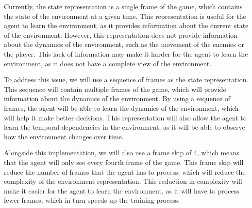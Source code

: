 Currently, the state representation is a single frame of the game, which
contains the state of the environment at a given time. This representation is
useful for the agent to learn the environment, as it provides information about
the current state of the environment. However, this representation does not
provide information about the dynamics of the environment, such as the movement
of the enemies or the player. This lack of information may make it harder for
the agent to learn the environment, as it does not have a complete view of the
environment.

To address this issue, we will use a sequence of frames as the state
representation. This sequence will contain multiple frames of the game, which
will provide information about the dynamics of the environment. By using a
sequence of frames, the agent will be able to learn the dynamics of the
environment, which will help it make better decisions. This representation will
also allow the agent to learn the temporal dependencies in the environment, as
it will be able to observe how the environment changes over time.

Alongside this implementation, we will also use a frame skip of 4, which means
that the agent will only see every fourth frame of the game. This frame skip
will reduce the number of frames that the agent has to process, which will
reduce the complexity of the environment representation. This reduction in
complexity will make it easier for the agent to learn the environment, as it
will have to process fewer frames, which in turn speeds up the training
process.